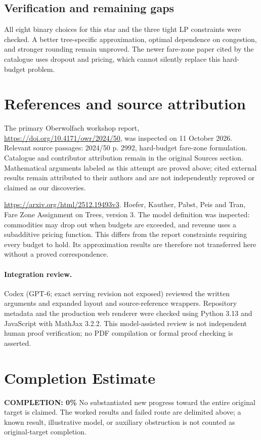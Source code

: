 \documentclass[11pt]{article}
\begin{document}
\subsection{Verification and remaining gaps}
All eight binary choices for this star and the three tight LP constraints were checked. A better tree-specific approximation, optimal dependence on congestion, and stronger rounding remain unproved. The newer fare-zone paper cited by the catalogue uses dropout and pricing, which cannot silently replace this hard-budget problem.

\section{References and source attribution}
The primary Oberwolfach workshop report, \url{https://doi.org/10.4171/owr/2024/50}, was inspected on 11 October 2026. Relevant source passages: 2024/50 p. 2992, hard-budget fare-zone formulation. Catalogue and contributor attribution remain in the original Sources section. Mathematical arguments labeled as this attempt are proved above; cited external results remain attributed to their authors and are not independently reproved or claimed as our discoveries.

\url{https://arxiv.org/html/2512.19493v3}. Hoefer, Kauther, Pabst, Peis and Tran, Fare Zone Assignment on Trees, version 3. The model definition was inspected: commodities may drop out when budgets are exceeded, and revenue uses a subadditive pricing function. This differs from the report constraints requiring every budget to hold. Its approximation results are therefore not transferred here without a proved correspondence.


\paragraph{Integration review.} Codex (GPT-6; exact serving revision not exposed) reviewed the written arguments and expanded layout and source-reference wrappers. Repository metadata and the production web renderer were checked using Python 3.13 and JavaScript with MathJax 3.2.2. This model-assisted review is not independent human proof verification; no PDF compilation or formal proof checking is asserted.

\section{Completion Estimate}
\noindent\textbf{COMPLETION: 0\%}
No substantiated new progress toward the entire original target is claimed. The worked results and failed route are delimited above; a known result, illustrative model, or auxiliary obstruction is not counted as original-target completion.
\end{document}
